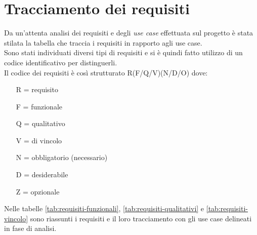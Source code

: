 \section{Tracciamento dei requisiti}
Da un'attenta analisi dei requisiti e degli \textit{use case} effettuata sul progetto è
stata stilata la tabella che traccia i requisiti in rapporto agli use case.\\
Sono stati individuati diversi tipi di requisiti e si è quindi fatto utilizzo
di un codice identificativo per distinguerli.\\
Il codice dei requisiti è così strutturato R(F/Q/V)(N/D/O) dove:
\begin{enumerate}[nolistsep]
    \item[R =] requisito
    \item[F =] funzionale
    \item[Q =] qualitativo
    \item[V =] di vincolo
    \item[N =] obbligatorio (necessario)
    \item[D =] desiderabile
    \item[Z =] opzionale
\end{enumerate}
Nelle tabelle \ref{tab:requisiti-funzionali}, \ref{tab:requisiti-qualitativi} e
\ref{tab:requisiti-vincolo} sono riassunti i requisiti e il loro tracciamento
con gli use case delineati in fase di analisi.



